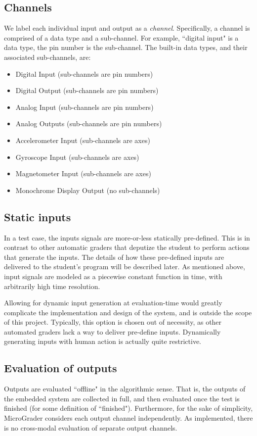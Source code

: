 \documentclass[12pt]{article}
\begin{document}
\subsection{Channels}
We label each individual input and output as a \textit{channel}.  Specifically, a channel is comprised of a data type and a sub-channel.  For example, ``digital input" is a data type, the pin number is the sub-channel.  The built-in data types, and their associated sub-channels, are:

\begin{itemize}
\item Digital Input (sub-channels are pin numbers)
\item Digital Output (sub-channels are pin numbers)
\item Analog Input (sub-channels are pin numbers)
\item Analog Outputs (sub-channels are pin numbers)
\item Accelerometer Input (sub-channels are axes)
\item Gyroscope Input (sub-channels are axes)
\item Magnetometer Input (sub-channels are axes)
\item Monochrome Display Output (no sub-channels)
\end{itemize}

\subsection{Static inputs}
\label{sec:static-inputs}
In a test case, the inputs signals are more-or-less statically pre-defined.  This is in contrast to other automatic graders that deputize the student to perform actions that generate the inputs.  The details of how these pre-defined inputs are delivered to the student's program will be described later.  As mentioned above, input signals are modeled as a piecewise constant function in time, with arbitrarily high time resolution.

Allowing for dynamic input generation at evaluation-time would greatly complicate the implementation and design of the system, and is outside the scope of this project.  Typically, this option is chosen out of necessity, as other automated graders lack a way to deliver pre-define inputs.  Dynamically generating inputs with human action is actually quite restrictive.

\subsection{Evaluation of outputs}
Outputs are evaluated ``offline" in the algorithmic sense.  That is, the outputs of the embedded system are collected in full, and then evaluated once the test is finished (for some definition of ``finished").  Furthermore, for the sake of simplicity, MicroGrader considers each output channel independently.  As implemented, there is no cross-modal evaluation of separate output channels.
\end{document}
